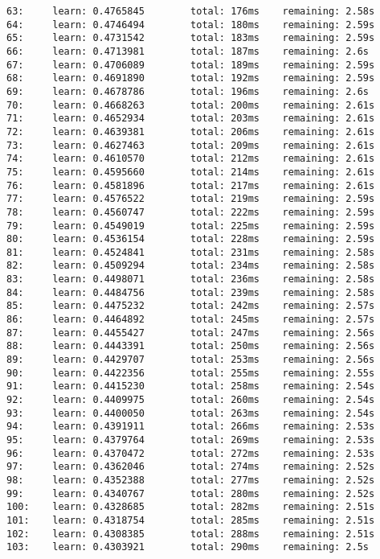 \documentclass[11pt]{article}
\begin{document}
\begin{Verbatim}[commandchars=\\\{\}]
63:     learn: 0.4765845        total: 176ms    remaining: 2.58s
64:     learn: 0.4746494        total: 180ms    remaining: 2.59s
65:     learn: 0.4731542        total: 183ms    remaining: 2.59s
66:     learn: 0.4713981        total: 187ms    remaining: 2.6s
67:     learn: 0.4706089        total: 189ms    remaining: 2.59s
68:     learn: 0.4691890        total: 192ms    remaining: 2.59s
69:     learn: 0.4678786        total: 196ms    remaining: 2.6s
70:     learn: 0.4668263        total: 200ms    remaining: 2.61s
71:     learn: 0.4652934        total: 203ms    remaining: 2.61s
72:     learn: 0.4639381        total: 206ms    remaining: 2.61s
73:     learn: 0.4627463        total: 209ms    remaining: 2.61s
74:     learn: 0.4610570        total: 212ms    remaining: 2.61s
75:     learn: 0.4595660        total: 214ms    remaining: 2.61s
76:     learn: 0.4581896        total: 217ms    remaining: 2.61s
77:     learn: 0.4576522        total: 219ms    remaining: 2.59s
78:     learn: 0.4560747        total: 222ms    remaining: 2.59s
79:     learn: 0.4549019        total: 225ms    remaining: 2.59s
80:     learn: 0.4536154        total: 228ms    remaining: 2.59s
81:     learn: 0.4524841        total: 231ms    remaining: 2.58s
82:     learn: 0.4509294        total: 234ms    remaining: 2.58s
83:     learn: 0.4498071        total: 236ms    remaining: 2.58s
84:     learn: 0.4484756        total: 239ms    remaining: 2.58s
85:     learn: 0.4475232        total: 242ms    remaining: 2.57s
86:     learn: 0.4464892        total: 245ms    remaining: 2.57s
87:     learn: 0.4455427        total: 247ms    remaining: 2.56s
88:     learn: 0.4443391        total: 250ms    remaining: 2.56s
89:     learn: 0.4429707        total: 253ms    remaining: 2.56s
90:     learn: 0.4422356        total: 255ms    remaining: 2.55s
91:     learn: 0.4415230        total: 258ms    remaining: 2.54s
92:     learn: 0.4409975        total: 260ms    remaining: 2.54s
93:     learn: 0.4400050        total: 263ms    remaining: 2.54s
94:     learn: 0.4391911        total: 266ms    remaining: 2.53s
95:     learn: 0.4379764        total: 269ms    remaining: 2.53s
96:     learn: 0.4370472        total: 272ms    remaining: 2.53s
97:     learn: 0.4362046        total: 274ms    remaining: 2.52s
98:     learn: 0.4352388        total: 277ms    remaining: 2.52s
99:     learn: 0.4340767        total: 280ms    remaining: 2.52s
100:    learn: 0.4328685        total: 282ms    remaining: 2.51s
101:    learn: 0.4318754        total: 285ms    remaining: 2.51s
102:    learn: 0.4308385        total: 288ms    remaining: 2.51s
103:    learn: 0.4303921        total: 290ms    remaining: 2.5s

\end{Verbatim}
\end{document}
